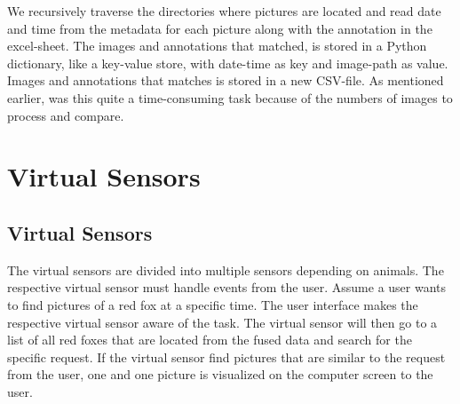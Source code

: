 \documentclass[USenglish]{uit-thesis}
\begin{document}
We recursively traverse the directories where pictures are located and read date and time from the metadata for each picture along with the annotation in the excel-sheet. The images and annotations that matched, is stored in a Python dictionary, like a key-value store, with date-time as key and image-path as value. Images and annotations that matches is stored in a new CSV-file.
As mentioned earlier, was this quite a time-consuming task because of the numbers of images to process and compare.




\section{Virtual Sensors}



\subsection{Virtual Sensors} \label{ssec:des_vs}
The virtual sensors are divided into multiple sensors depending on animals. The respective virtual sensor must handle events from the user. Assume a user wants to find pictures of a red fox at a specific time.  The user interface makes the respective virtual sensor aware of the task. The virtual sensor will then go to a list of all red foxes that are located from the fused data and search for the specific request. If the virtual sensor find pictures that are similar to the request from the user, one and one picture is visualized on the computer screen to the user.
\end{document}
